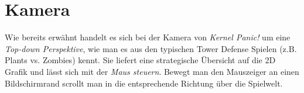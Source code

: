 \section{Kamera}
Wie bereits erwähnt handelt es sich bei der Kamera von \textit{Kernel Panic!} um eine \textit{Top-down Perspektive}, wie man es aus den typischen Tower Defense Spielen (z.B. Plants vs. Zombies) kennt.
Sie liefert eine strategische Übersicht auf die 2D Grafik und lässt sich mit der \textit{Maus steuern}.
Bewegt man den Mauszeiger an einen Bildschirmrand scrollt man in die entsprechende Richtung über die Spielwelt.


